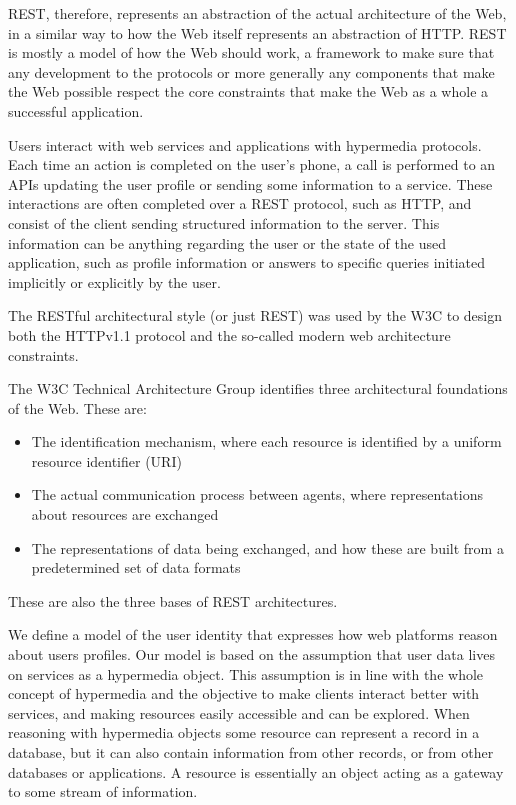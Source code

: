REST, therefore, represents an abstraction of the actual architecture of the Web, in a similar way to how the Web itself represents an abstraction of HTTP. REST is mostly a model of how the Web should work, a framework to make sure that any development to the protocols or more generally any components that make the Web possible respect the core constraints that make the Web as a whole a successful application.

Users interact with web services and applications with hypermedia protocols. Each time an action is completed on the user's phone, a call is performed to an APIs updating the user profile or sending some information to a service. These interactions are often completed over a REST protocol, such as HTTP, and consist of the client sending structured information to the server. This information can be anything regarding the user or the state of the used application, such as profile information or answers to specific queries initiated implicitly or explicitly by the user.

The RESTful architectural style (or just REST) was used by the W3C to design both the HTTPv1.1 protocol and the so-called modern web architecture constraints.

The W3C Technical Architecture Group identifies  three architectural foundations of the Web. These are:
\begin{itemize}
    \item The identification mechanism, where each resource is identified by  a uniform resource  identifier (URI)
    \item The actual  communication process between agents, where representations about resources are exchanged
    \item The representations  of data  being exchanged, and how these are built from a predetermined set of data formats
\end{itemize}

These are also the three bases of REST architectures.

We define a model of the user identity that expresses how web platforms reason about users profiles. Our model is based on the assumption that user data lives on services as a hypermedia object. This assumption is in line with the whole concept of hypermedia and the objective to make clients interact better with services, and making resources easily accessible and can be explored. 
When reasoning with hypermedia objects some resource can represent a record in a database, but it can also contain information from other records, or from other databases or applications. A resource is essentially an object acting as a gateway to some stream of information.


